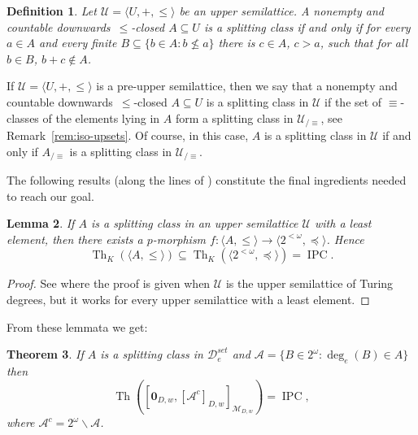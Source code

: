 \documentclass[11pt]{amsart}
\newtheorem{theorem}{Theorem}[section]
\newtheorem{lemma}[theorem]{Lemma}
\newtheorem{defi}[theorem]{Definition}
\newenvironment{definition}{\begin{defi} \rm}{ \end{defi}}
\newcommand{\Th}{\operatorname{Th}}
\newcommand{\IPC}{\operatorname{IPC}}
\begin{document}
\begin{definition}\label{def:splittingclass}
Let $\mathscr{U}=\langle U, +, \le\rangle$ be an upper semilattice. A 
nonempty and countable downwards~$\leq$-closed $A\subseteq U$ is a 
\emph{splitting class} if and only if for every $a \in A$ and every finite 
$B\subseteq \{b \in A: b\nleq a\}$ there is $c \in A$, $c> a$, such that for 
all $b \in B$, $b+ c \notin A$. 
\end{definition}

If $\mathscr{U}=\langle U, +, \le\rangle$ is a pre-upper semilattice, then we 
say that a nonempty and countable downwards~$\leq$-closed $A\subseteq U$ is a 
splitting class in $\mathscr{U}$ if the set of $\equiv$-classes of the 
elements lying in $A$ form a splitting class in $\mathscr{U}_{/\equiv}$, see 
Remark~\ref{rem:iso-upsets}. Of course, in this case, $A$ is a splitting 
class in $\mathscr{U}$ if and only if $A_{/\equiv}$ is a splitting class in 
$\mathscr{U}_{/\equiv}$. 

The following results (along the lines of \cite{Kuyper-Muchnik}) constitute 
the final ingredients needed to reach our goal. 

\begin{lemma}\cite[Proposition~5.6]{Kuyper-Muchnik}\label{lem:binary-tree}
If $A$ is a splitting class in an upper semilattice $\mathscr{U}$ with a 
least element, then there exists a $p$-morphism $f: \langle A, \leq \rangle 
\longrightarrow \langle 2^{<\omega}, \preceq \rangle$. Hence 
\[
\Th_K\left(\langle A, \leq\rangle\right) \subseteq  
\Th_K\left(\langle 2^{<\omega}, \preceq \rangle\right)=\IPC.
\]
\end{lemma}

\begin{proof}
See \cite[Proposition~5.6]{Kuyper-Muchnik} where the proof is given when 
$\mathscr{U}$ is the upper semilattice of Turing degrees, but it works for 
every upper semilattice with a least element.
\end{proof}

From these lemmata we get:

\begin{theorem}\cite[Proposition~5.2 and Theorem~5.7]{Kuyper-Muchnik}\label{cor:fund-splitting} If $A$ is a splitting class in 
$\mathscr{D}_e^{set}$ and $\mathcal{A}=\{B\in 2^\omega: \deg_e(B) \in A\}$
then 
\[
\Th\left(\left[\mathbf{0}_{D,w}, 
[\mathcal{A}^c]_{D,w}\right]_{\mathscr{M}_{D,w}}\right)=\IPC,
\]
where $\mathcal{A}^c=2^\omega \smallsetminus \mathcal{A}$.
\end{theorem}
\end{document}
